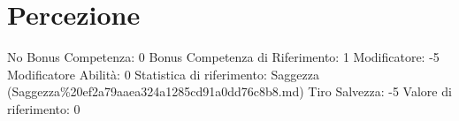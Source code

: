 \section{Percezione}\label{percezione}

\begin{description}
\tightlist
\item[Tags: ABI]
No Bonus Competenza: 0 Bonus Competenza di Riferimento: 1 Modificatore:
-5 Modificatore Abilità: 0 Statistica di riferimento: Saggezza
(Saggezza\%20ef2a79aaea324a1285cd91a0dd76c8b8.md) Tiro Salvezza: -5
Valore di riferimento: 0
\end{description}
